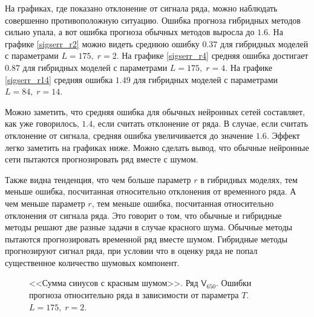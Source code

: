 \documentclass[specialist,
               substylefile = spbu.rtx,
               subf,href,colorlinks=true, 12p]{disser}
\begin{document}
На графиках, где показано отклонение от сигнала ряда, можно наблюдать совершенно противоположную ситуацию. Ошибка прогноза гибридных методов сильно упала, а вот ошибка прогноза обычных методов выросла до $1.6$. На графике \ref{sigserr_r2} можно видеть среднюю ошибку $0.37$ для гибридных моделей с параметрами $L = 175, \; r = 2$. На графике \ref{sigserr_r4} средняя ошибка достигает $0.87$ для гибридных моделей с параметрами $L = 175, \; r = 4$. На графике \ref{sigserr_r14} средняя ошибка $1.49$ для гибридных моделей с параметрами $L = 84, \; r = 14$.

Можно заметить, что средняя ошибка для обычных нейронных сетей составляет, как уже говорилось, $1.4$, если считать отклонение от ряда. В случае, если считать отклонение от сигнала, средняя ошибка увеличивается до значение $1.6$. Эффект легко заметить на графиках ниже. Можно сделать вывод, что обычные нейронные сети пытаются прогнозировать ряд вместе с шумом.

Также видна тенденция, что чем больше параметр $r$ в гибридных моделях, тем меньше ошибка, посчитанная относительно отклонения от временного ряда. А чем меньше параметр $r$, тем меньше ошибка, посчитанная относительно отклонения от сигнала ряда. Это говорит о том, что обычные и гибридные методы решают две разные задачи в случае красного шума. Обычные методы пытаются прогнозировать временной ряд вместе шумом. Гибридные методы прогнозируют сигнал ряда, при условии что в оценку ряда не попал существенное количество шумовых компонент.

\begin{figure}[H]
	\captionsetup{justification=centering}
	\caption{<<Сумма синусов с красным шумом>>. Ряд $\mathsf{V}_{650}$. Ошибки прогноза относительно ряда в зависимости от параметра $T$. $L = 175, \; r = 2$.}
	\label{serr_r2}
\end{figure}
\end{document}
